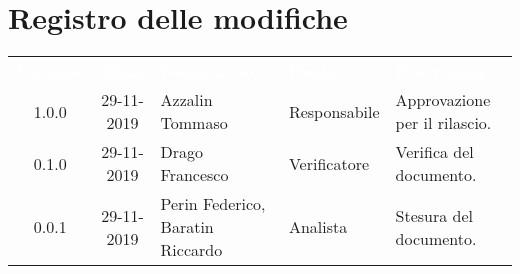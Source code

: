 \section*{Registro delle modifiche}
{
\renewcommand{\arraystretch}{1.5}
\centering
\begin{longtable}{ c c  C{4cm}  C{3cm} C{4cm}}
\textcolor{white}{\textbf{Versione}} & \textcolor{white}{\textbf{Data}} & \textcolor{white}{\textbf{Nominativo}} & \textcolor{white}{\textbf{Ruolo}} & \textcolor{white}{\textbf{Descrizione}}\\	


1.0.0 & 29-11-2019 & Azzalin Tommaso & Responsabile & Approvazione per il rilascio.  \\
		
0.1.0 & 29-11-2019 & Drago Francesco & Verificatore & Verifica del documento.  \\
		
0.0.1 & 29-11-2019 & Perin Federico, Baratin Riccardo  & Analista & Stesura del documento.  \\
        

\end{longtable}
}